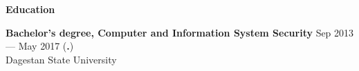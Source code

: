\documentclass{resume}
\begin{document}

\begin{rSection}{\textbf{Education}}

\textbf{Bachelor's degree, Computer and Information System Security} \hfill {Sep 2013 --- May 2017 ({\textbf{.}})} \\
	  Dagestan State University

\end{rSection}
\end{document}
